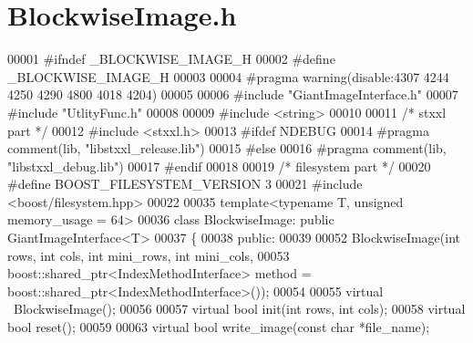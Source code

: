 \section{Blockwise\-Image.\-h}
\label{_blockwise_image_8h}

\begin{DoxyCode}
00001 \textcolor{preprocessor}{#ifndef \_BLOCKWISE\_IMAGE\_H}
00002 \textcolor{preprocessor}{}\textcolor{preprocessor}{#define \_BLOCKWISE\_IMAGE\_H}
00003 \textcolor{preprocessor}{}
00004 \textcolor{preprocessor}{#pragma warning(disable:4307 4244 4250 4290 4800 4018 4204)}
00005 \textcolor{preprocessor}{}
00006 \textcolor{preprocessor}{#include "GiantImageInterface.h"}
00007 \textcolor{preprocessor}{#include "UtlityFunc.h"}
00008 
00009 \textcolor{preprocessor}{#include <string>}
00010 
00011 \textcolor{comment}{/* stxxl part */}
00012 \textcolor{preprocessor}{#include <stxxl.h>}
00013 \textcolor{preprocessor}{#ifdef NDEBUG}
00014 \textcolor{preprocessor}{}\textcolor{preprocessor}{#pragma comment(lib, "libstxxl\_release.lib")}
00015 \textcolor{preprocessor}{}\textcolor{preprocessor}{#else}
00016 \textcolor{preprocessor}{}\textcolor{preprocessor}{#pragma comment(lib, "libstxxl\_debug.lib")}
00017 \textcolor{preprocessor}{}\textcolor{preprocessor}{#endif}
00018 \textcolor{preprocessor}{}
00019 \textcolor{comment}{/* filesystem part */}
00020 \textcolor{preprocessor}{#define BOOST\_FILESYSTEM\_VERSION 3}
00021 \textcolor{preprocessor}{}\textcolor{preprocessor}{#include <boost/filesystem.hpp>}
00022 
00035 \textcolor{keyword}{template}<\textcolor{keyword}{typename} T, \textcolor{keywordtype}{unsigned} memory\_usage = 64>
00036 \textcolor{keyword}{class }BlockwiseImage: \textcolor{keyword}{public} GiantImageInterface<T>
00037 \{
00038 \textcolor{keyword}{public}:
00039 
00052         BlockwiseImage(\textcolor{keywordtype}{int} rows, \textcolor{keywordtype}{int} cols, \textcolor{keywordtype}{int} mini\_rows, \textcolor{keywordtype}{int} mini\_cols, 
00053                 boost::shared\_ptr<IndexMethodInterface> method = 
      boost::shared\_ptr<IndexMethodInterface>());
00054 
00055         \textcolor{keyword}{virtual} ~BlockwiseImage();
00056 
00057         \textcolor{keyword}{virtual} \textcolor{keywordtype}{bool} init(\textcolor{keywordtype}{int} rows, \textcolor{keywordtype}{int} cols);
00058         \textcolor{keyword}{virtual} \textcolor{keywordtype}{bool} reset();
00059 
00063         \textcolor{keyword}{virtual} \textcolor{keywordtype}{bool} write_image(\textcolor{keyword}{const} \textcolor{keywordtype}{char} *file\_name);

\end{DoxyCode}
